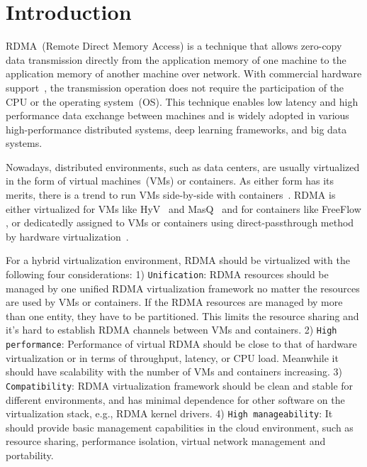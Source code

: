\section{Introduction}
RDMA~(Remote Direct Memory Access) is a technique that allows zero-copy data transmission directly from the application memory of one machine to the application memory of another machine over network. With commercial hardware support~\cite{roce, iwarp, infiniband}, the transmission operation does not require the participation of the CPU or the operating system~(OS). This technique enables low latency and high performance data exchange between machines and is widely adopted in various high-performance distributed systems, deep learning frameworks, and big data systems.


Nowadays, distributed environments, such as data centers, are usually virtualized in the form of virtual machines~(VMs) or containers. As either form has its merits, there is a trend to run VMs side-by-side with containers~\cite{rethinkingvirtualization}. RDMA is either virtualized for VMs like HyV~\cite{pfefferle2015hybrid} and MasQ~\cite{he2020masq} and for containers like FreeFlow \cite{kim2019freeflow}, or dedicatedly assigned to VMs or containers using direct-passthrough method by hardware virtualization~\cite{sr-iov}.

For a hybrid virtualization environment, RDMA should be virtualized with the following four considerations: 
1) {\verb|Unification|}: RDMA resources should be managed by one unified RDMA virtualization framework no matter the resources are used by VMs or containers. If the RDMA resources are managed by more than one entity, they have to be partitioned. This limits the resource sharing and it's hard to establish RDMA channels between VMs and containers.
2) {\verb|High performance|}: Performance of virtual RDMA should be close to that of hardware virtualization or \native in terms of throughput, latency, or CPU load. Meanwhile it should have scalability with the number of VMs and containers increasing.
3) {\verb|Compatibility|}: RDMA virtualization framework should be clean and stable for different environments, and has minimal dependence for other software on the virtualization stack, e.g., RDMA kernel drivers.
4)  {\verb|High manageability|}: It should provide basic management capabilities in the cloud environment, such as resource sharing, performance isolation, virtual network management and portability.


